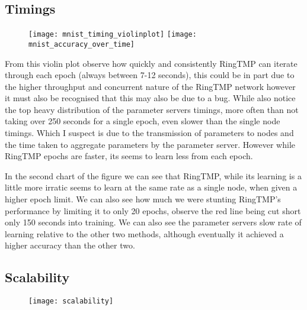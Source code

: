 
\subsection{Timings}

\begin{figure}[h]
    \centering 
    \texttt{[image: mnist\_timing\_violinplot]}
    \texttt{[image: mnist\_accuracy\_over\_time]}

\end{figure}

From this violin plot observe how quickly and consistently RingTMP can iterate
through each epoch (always between 7-12 seconds), this could be in part due to
the higher throughput and concurrent nature of the RingTMP network however it
must also be recognised that this may also be due to a bug. While also notice
the top heavy distribution of the parameter servers timings, more often than not
taking over 250 seconds for a single epoch, even slower than the single node
timings. Which I suspect is due to the transmission of parameters to nodes and
the time taken to aggregate parameters by the parameter server. However while
RingTMP epochs are faster, its seems to learn less from each epoch.

In the second chart of the figure we can see that RingTMP, while its learning is
a little more irratic seems to learn at the same rate as a single node, when
given a higher epoch limit. We can also see how much we were stunting RingTMP's
performance by limiting it to only 20 epochs, observe the red line being cut
short only 150 seconds into training. We can also see the parameter servers slow
rate of learning relative to the other two methods, although eventually it
achieved a higher accuracy than the other two.

\subsection{Scalability}
\begin{figure}[h]
    \centering
    \texttt{[image: scalability]}
\end{figure}


